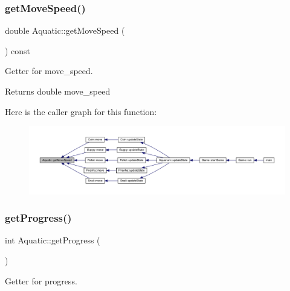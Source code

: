 \subsubsection{\texorpdfstring{get\+Move\+Speed()}{getMoveSpeed()}}
{\footnotesize\ttfamily double Aquatic\+::get\+Move\+Speed (\begin{DoxyParamCaption}{ }\end{DoxyParamCaption}) const}



Getter for move\+\_\+speed. 

\begin{DoxyReturn}{Returns}
double move\+\_\+speed 
\end{DoxyReturn}
Here is the caller graph for this function\+:\nopagebreak
\begin{figure}[H]
\begin{center}
\leavevmode
\includegraphics[width=350pt]{class_aquatic_a4153178bfefdc57cbcd05fe44054dac9_icgraph}
\end{center}
\end{figure}
\mbox{\label{class_aquatic_a0de76e489d82ccad52dec32a1978850c}} 
\subsubsection{\texorpdfstring{get\+Progress()}{getProgress()}}
{\footnotesize\ttfamily int Aquatic\+::get\+Progress (\begin{DoxyParamCaption}{ }\end{DoxyParamCaption})}



Getter for progress. 

